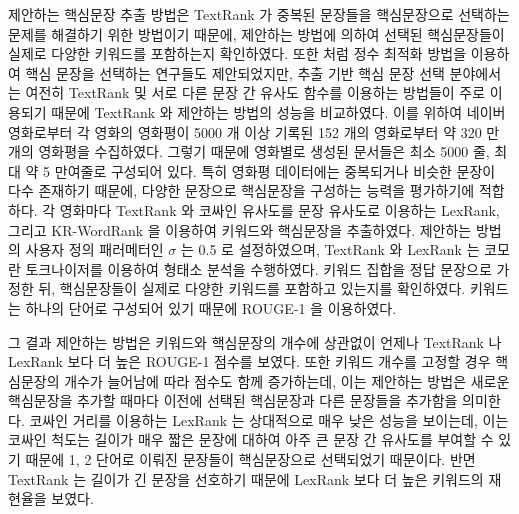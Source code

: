 \documentclass[oneside, ko,phd]{snuthesis_utf8_kor}
\begin{document}
제안하는 핵심문장 추출 방법은 TextRank 가 중복된 문장들을 핵심문장으로 선택하는 문제를 해결하기 위한 방법이기 때문에, 제안하는 방법에 의하여 선택된 핵심문장들이 실제로 다양한 키워드를 포함하는지 확인하였다.
또한 \cite{mcdonald2007study, parveen2015topical} 처럼 정수 최적화 방법을 이용하여 핵심 문장을 선택하는 연구들도 제안되었지만, 추출 기반 핵심 문장 선택 분야에서는 여전히 TextRank 및 서로 다른 문장 간 유사도 함수를 이용하는 방법들이 주로 이용되기 때문에 TextRank 와 제안하는 방법의 성능을 비교하였다.
이를 위하여 네이버 영화로부터 각 영화의 영화평이 5000 개 이상 기록된 152 개의 영화로부터 약 320 만개의 영화평을 수집하였다.
그렇기 때문에 영화별로 생성된 문서들은 최소 5000 줄, 최대 약 5 만여줄로 구성되어 있다.
특히 영화평 데이터에는 중복되거나 비슷한 문장이 다수 존재하기 때문에, 다양한 문장으로 핵심문장을 구성하는 능력을 평가하기에 적합하다.
각 영화마다 TextRank 와 코싸인 유사도를 문장 유사도로 이용하는 LexRank, 그리고 KR-WordRank 을 이용하여 키워드와 핵심문장을 추출하였다.
제안하는 방법의 사용자 정의 패러메터인 $\sigma$ 는 0.5 로 설정하였으며, TextRank 와 LexRank 는 코모란 토크나이저를 이용하여 형태소 분석을 수행하였다.
키워드 집합을 정답 문장으로 가정한 뒤, 핵심문장들이 실제로 다양한 키워드를 포함하고 있는지를 확인하였다.
키워드는 하나의 단어로 구성되어 있기 때문에 ROUGE-1 을 이용하였다.

그 결과 제안하는 방법은 키워드와 핵심문장의 개수에 상관없이 언제나 TextRank 나 LexRank 보다 더 높은 ROUGE-1 점수를 보였다.
또한 키워드 개수를 고정할 경우 핵심문장의 개수가 늘어남에 따라 점수도 함께 증가하는데, 이는 제안하는 방법은 새로운 핵심문장을 추가할 때마다 이전에 선택된 핵심문장과 다른 문장들을 추가함을 의미한다.
코싸인 거리를 이용하는 LexRank 는 상대적으로 매우 낮은 성능을 보이는데, 이는 코싸인 척도는 길이가 매우 짧은 문장에 대하여 아주 큰 문장 간 유사도를 부여할 수 있기 때문에 1, 2 단어로 이뤄진 문장들이 핵심문장으로 선택되었기 때문이다.
반면 TextRank 는 길이가 긴 문장을 선호하기 때문에 LexRank 보다 더 높은 키워드의 재현율을 보였다.
\end{document}
